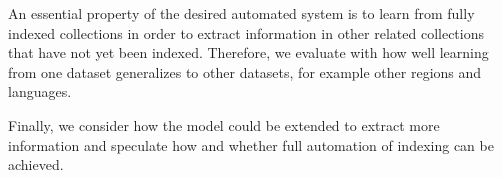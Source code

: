 


An essential property of the desired automated system is to learn from fully indexed collections in order to extract information in other related collections that have not yet been indexed.
Therefore, we evaluate with how well learning from one dataset generalizes to other datasets, for example other regions and languages.

Finally, we consider how the model could be extended to extract more information and speculate how and whether full automation of indexing can be achieved.

